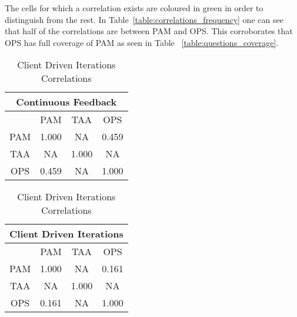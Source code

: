 The cells for which a correlation exists are coloured in green in order to distinguish from the rest. In Table~\ref{table:correlations_frequency} one can see that half of the correlations are between PAM and OPS. This corroborates that OPS has full coverage of PAM as seen in Table ~\ref{table:questions_coverage}. %

\begin{table} [H]
 \RawFloats %
 \begin{minipage}{.45\textwidth}
  \caption{Continuous Feedback Correlations}
  \label{table:cf_correlations}
   \begin{tabular}{| c | c | c | c |} \hline
   \multicolumn{4}{|c|}{\textbf{Continuous Feedback}}  \\ \hline
   & PAM & TAA & OPS \\ \hline
   PAM & 1.000 & NA & \cellcolor{green}0.459 \\ \hline
   TAA & NA & 1.000 & NA \\ \hline
   OPS & \cellcolor{green}0.459 & NA & 1.000 \\ \hline
  \end{tabular}
 \end{minipage}%
%
 \begin{minipage}{.45\textwidth}
  \centering
  \caption{Client Driven Iterations Correlations}
  \label{table:cdi_correlations}
  \begin{tabular}{| c | c | c | c |} \hline
  \multicolumn{4}{|c|}{\textbf{Client Driven Iterations}}  \\ \hline
   & PAM & TAA & OPS \\ \hline
  PAM & 1.000 & NA & \cellcolor{green}0.161 \\ \hline
  TAA & NA & 1.000 & NA \\ \hline
  OPS & \cellcolor{green}0.161 & NA & 1.000 \\ \hline
 \end{tabular}
 \end{minipage}%
\end{table}


